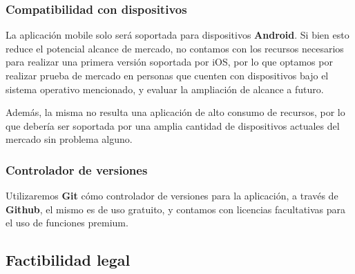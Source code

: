 \documentclass[a4paper,12pt]{article}
\begin{document}
    \subsubsection{Compatibilidad con dispositivos}
    \par La aplicación mobile solo será soportada para dispositivos \textbf{Android}. Si bien esto reduce el potencial alcance de mercado, no contamos con los recursos necesarios para realizar una primera versión soportada por iOS, por lo que optamos por realizar prueba de mercado en personas que cuenten con dispositivos bajo el sistema operativo mencionado, y evaluar la ampliación de alcance a futuro.
    \par Además, la misma no resulta una aplicación de alto consumo de recursos, por lo que debería ser soportada por una amplia cantidad de dispositivos actuales del mercado sin problema alguno.
    \subsubsection{Controlador de versiones}
    \par Utilizaremos \textbf{Git} cómo controlador de versiones para la aplicación, a través de \textbf{Github}, el mismo es de uso gratuito, y contamos con licencias facultativas para el uso de funciones premium.
    \subsection{Factibilidad legal}
\end{document}
